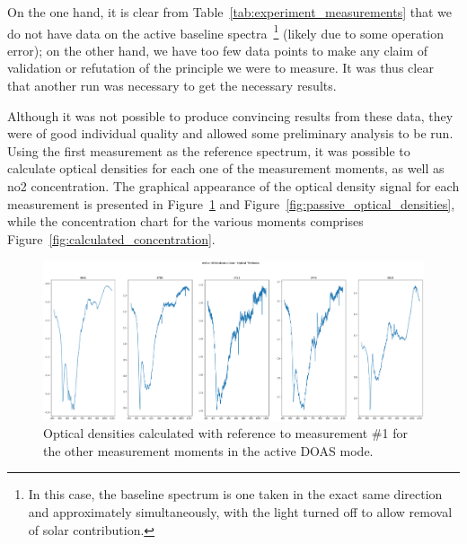 \begin{table}[htpb]
    \centering
    \caption{First run: measurement table.}
    \label{tab:experiment_measurements}
\end{table}

On the one hand, it is clear from
Table~\ref{tab:experiment_measurements} that we do not have data on the
active baseline spectra~\footnote{In this case, the baseline spectrum is
one taken in the exact same direction and approximately
simultaneously, with the light turned off to allow removal of solar
contribution.} (likely due to some operation error); on the other hand,
we have too few data points to make any claim of validation or
refutation of the principle we were to measure. It was thus clear that
another run was necessary to get the necessary results.

Although it was not possible to produce convincing results from these
data, they were of good individual quality and allowed some preliminary
analysis to be run. Using the first measurement as the reference
spectrum, it was possible to calculate optical densities for each one of
the measurement moments, as well as \gls{no2} concentration. The
graphical appearance of the optical density signal for each measurement
is presented in Figure~\ref{fig:active_optical_densities} and
Figure~\ref{fig:passive_optical_densities}, while the concentration
chart for the various moments comprises
Figure~\ref{fig:calculated_concentration}.

\begin{figure}[htpb]
    \centering
    \includegraphics[width=0.8\linewidth]{img/png/tau_activeDOAS.png}
    \caption{Optical densities calculated with reference to measurement
    \#1 for the other measurement moments in the active DOAS mode.} 
    \label{fig:active_optical_densities}
\end{figure}

